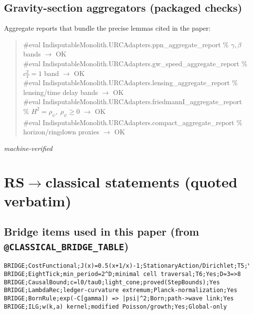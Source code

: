 \documentclass[12pt,a4paper]{article}
\begin{document}
\subsection*{Gravity-section aggregators (packaged checks)}
\noindent Aggregate reports that bundle the precise lemmas cited in the paper:
\begin{quote}\small\ttfamily
\#eval IndisputableMonolith.URCAdapters.ppn\_aggregate\_report \quad\% \(\gamma,\beta\) bands \(\to\) OK\\
\#eval IndisputableMonolith.URCAdapters.gw\_speed\_aggregate\_report \quad\% \(c_T^2=1\) band \(\to\) OK\\
\#eval IndisputableMonolith.URCAdapters.lensing\_aggregate\_report \quad\% lensing/time delay bands \(\to\) OK\\
\#eval IndisputableMonolith.URCAdapters.friedmannI\_aggregate\_report \quad\% \(H^2=\rho_\psi,\ \rho_\psi\ge 0\) \(\to\) OK\\
\#eval IndisputableMonolith.URCAdapters.compact\_aggregate\_report \quad\% horizon/ringdown proxies \(\to\) OK
\end{quote}
\noindent\emph{machine-verified}

\section{RS$\to$classical statements (quoted verbatim)}
\label{app:bridge-verbatim}
\subsection*{Bridge items used in this paper (from \texttt{@CLASSICAL\_BRIDGE\_TABLE})}
\begin{verbatim}
BRIDGE;CostFunctional;J(x)=0.5(x+1/x)-1;StationaryAction/Dirichlet;T5;Yes
BRIDGE;EightTick;min_period=2^D;minimal cell traversal;T6;Yes;D=3=>8
BRIDGE;CausalBound;c=l0/tau0;light_cone;proved(StepBounds);Yes
BRIDGE;LambdaRec;ledger-curvature extremum;Planck-normalization;Yes
BRIDGE;BornRule;exp(-C[gamma]) => |psi|^2;Born;path->wave link;Yes
BRIDGE;ILG;w(k,a) kernel;modified Poisson/growth;Yes;Global-only
\end{verbatim}
\end{document}
